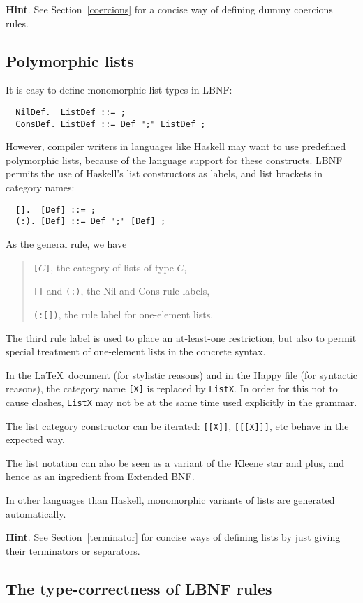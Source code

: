 \documentclass[10pt]{article}
\newcommand{\bequ}{\begin{quote}}
\newcommand{\enqu}{\end{quote}}
\begin{document}
{\bf Hint}. See Section~\ref{coercions} for a concise way of defining
dummy coercions rules.



\subsection{Polymorphic lists}

It is easy to define monomorphic list types in LBNF:
\begin{verbatim}
  NilDef.  ListDef ::= ;
  ConsDef. ListDef ::= Def ";" ListDef ;
\end{verbatim}
However, compiler writers in languages like
Haskell may want to use predefined
polymorphic lists, because of the language support for these constructs.
LBNF permits the use of Haskell's list constructors
as labels, and list brackets in category names:
\begin{verbatim}
  [].  [Def] ::= ;
  (:). [Def] ::= Def ";" [Def] ;
\end{verbatim}
As the general rule, we have
\bequ
{\tt[}$C${\tt ]}, the category of lists of type $C$,

{\tt []} and {\tt (:)}, the Nil and Cons rule labels,

{\tt (:[])}, the rule label for one-element lists.
\enqu
The third rule label is used to place an at-least-one restriction,
but also to permit special treatment of one-element lists
in the concrete syntax.

In the \LaTeX\ document (for stylistic reasons) and in the Happy file (for
syntactic reasons), the category name {\tt [X]} is replaced by {\tt ListX}.
In order for this not to cause clashes, {\tt ListX}
may not be at the same time used explicitly in the grammar.

The list category constructor can be iterated: {\tt [[X]]}, {\tt [[[X]]]}, etc
behave in the expected way.

The list notation can also be seen as a variant of the Kleene star and plus, and
hence as an ingredient from Extended BNF.

In other languages than Haskell, monomorphic variants of lists are generated
automatically.

{\bf Hint}. See Section~\ref{terminator} for concise ways of defining
lists by just giving their terminators or separators.


\subsection{The type-correctness of LBNF rules}
\end{document}
